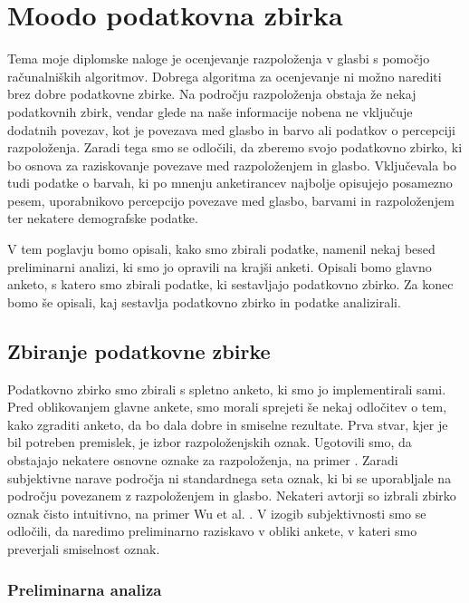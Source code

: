 \documentclass[a4paper, 12pt]{book}
\begin{document}
{\chapter{Moodo podatkovna zbirka}
\label{odatasetu}

Tema moje diplomske naloge je ocenjevanje razpoloženja v glasbi s pomočjo ra\-ču\-nal\-niš\-kih algoritmov. Dobrega algoritma za ocenjevanje ni možno narediti brez dobre podatkovne zbirke. Na področju razpoloženja obstaja že nekaj podatkovnih zbirk, vendar glede na naše informacije nobena ne vključuje dodatnih povezav, kot je povezava med glasbo in barvo ali podatkov o percepciji razpoloženja. Zaradi tega smo se odločili, da zberemo svojo podatkovno zbirko, ki bo osnova za raziskovanje povezave med razpoloženjem in glasbo. Vključevala bo tudi podatke o barvah, ki po mnenju anketirancev najbolje opisujejo posamezno pesem, uporabnikovo percepcijo povezave med glasbo, barvami in razpoloženjem ter nekatere demografske podatke.

V tem poglavju bomo opisali, kako smo zbirali podatke, namenil nekaj besed preliminarni analizi, ki smo jo opravili na krajši anketi. Opisali bomo glavno anketo, s katero smo zbirali podatke, ki sestavljajo podatkovno zbirko. Za konec bomo še opisali, kaj sestavlja podatkovno zbirko in podatke analizirali. 


\section{Zbiranje podatkovne zbirke}

Podatkovno zbirko smo zbirali s spletno anketo, ki smo jo implementirali sami. Pred oblikovanjem glavne ankete, smo morali sprejeti še nekaj odločitev o tem, kako zgraditi anketo, da bo dala dobre in smiselne rezultate. Prva stvar, kjer je bil potreben premislek, je izbor razpoloženjskih oznak. Ugotovili smo, da obstajajo nekatere osnovne oznake za razpoloženja, na primer \cite{dalgleish1999handbook}. Zaradi subjektivne narave področja ni standardnega seta oznak, ki bi se uporabljale na področju povezanem z razpoloženjem in glasbo. Nekateri avtorji so izbrali zbirko oznak čisto intuitivno, na primer Wu et al. \cite{Wu2013}. V izogib subjektivnosti smo se odločili, da naredimo preliminarno raziskavo v obliki ankete, v kateri smo preverjali smiselnost oznak. 

\subsection{Preliminarna analiza}
\label{preiliminarnaana}

}
\end{document}
